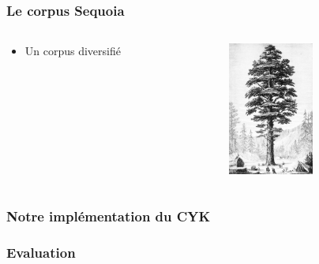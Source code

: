 \documentclass{beamer}
\begin{document}

\begin{frame}
  \frametitle{Le corpus Sequoia}
  \begin{columns}
  \begin{column}{0.5\textwidth}
    \begin{itemize}
     \item Un corpus diversifié
     
    \end{itemize}
   
  \end{column}
  
  \begin{column}{0.5\textwidth}
  \includegraphics[width=80pt,]{PSM_V03_D341_Sequoia_gigantea_of_california.jpg}  
  \end{column}

  \end{columns}

\end{frame}

\begin{frame}
\frametitle{Notre implémentation du CYK}

 
\end{frame}

\begin{frame}
\frametitle{Evaluation}

\end{frame}
\end{document}
